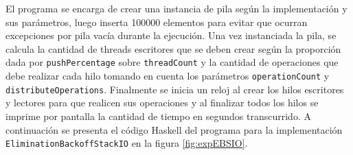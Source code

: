El programa se encarga de crear una instancia de pila según la implementación y sus parámetros, luego inserta 100000 elementos para evitar que ocurran excepciones por pila vacía durante la ejecución. Una vez instanciada la pila, se calcula la cantidad de threads escritores que se deben crear según la proporción dada por \texttt{pushPercentage} sobre \texttt{threadCount} y la cantidad de operaciones que debe realizar cada hilo tomando en cuenta los parámetros \texttt{operationCount} y \texttt{distributeOperations}. Finalmente se inicia un reloj al crear los hilos escritores y lectores para que realicen sus operaciones y al finalizar todos los hilos se imprime por pantalla la cantidad de tiempo en segundos transcurrido. A continuación se presenta el código Haskell del programa para la implementación \texttt{EliminationBackoffStackIO} en la figura \ref{fig:expEBSIO}.

